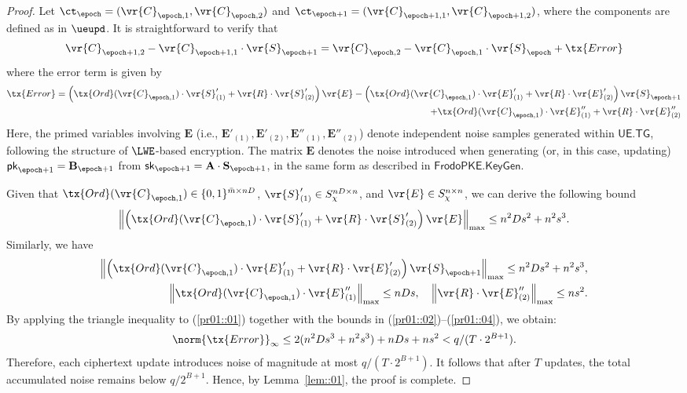 \documentclass{fundam}
\begin{document}
\begin{proof}
Let $\ct_{\epoch} =  (\vr{C}_{\epoch,1}, \vr{C}_{\epoch, 2})$ and $\ct_{\epoch+1} =  (\vr{C}_{\epoch+1,1}, \vr{C}_{\epoch+1, 2})$, where the components are defined as in $\ueupd$. It is straightforward to verify that 
 \begin{align*}
	\vr{C}_{\epoch+1,2} - \vr{C}_{\epoch +1, 1}\cdot \vr{S}_{\epoch +1} = \vr{C}_{\epoch,2} - \vr{C}_{\epoch , 1}\cdot \vr{S}_{\epoch } + \tx{Error}
\end{align*}
where the error term is given by
\begin{align}\label{pr01::01}
	\tx{Error}= \left(\tx{Ord}(\vr{C}_{\epoch , 1})\cdot\vr{S}_{(1)}' + \vr{R}\cdot \vr{S}_{(2)}'\right)\vr{E}- \left(\tx{Ord}(\vr{C}_{\epoch , 1})\cdot\vr{E}_{(1)}' + \vr{R}\cdot \vr{E}_{(2)}'\right)\vr{S}_{\epoch+1} \\
	+ \tx{Ord}(\vr{C}_{\epoch , 1})\cdot\vr{E}_{(1)}'' + \vr{R}\cdot \vr{E}_{(2)}'' \nonumber
\end{align}
Here, the primed variables involving $\mathbf{E}$ (i.e., $\mathbf{E}'_{(1)}, \mathbf{E}'_{(2)}, \mathbf{E}''_{(1)}, \mathbf{E}''_{(2)}$) denote independent noise samples generated within $\mathsf{UE.TG}$, following the structure of $\LWE$-based encryption. The matrix $\mathbf{E}$ denotes the noise introduced when generating (or, in this case, updating) $\mathsf{pk}_{\epoch+1} = \mathbf{B}_{\epoch+1}$ from $\mathsf{sk}_{\epoch+1} = \mathbf{A} \cdot \mathbf{S}_{\epoch+1}$, in the same form as described in $\mathsf{FrodoPKE.KeyGen}$.
%

\noindent Given that $\tx{Ord}(\vr{C}_{\epoch , 1})\in\{0,1\}^{\bar{m}\times nD}$, $\vr{S}_{(1)}' \in S_{\chi}^{nD\times n}$, and $\vr{E} \in S_{\chi}^{n\times n}$, we can derive the following bound
\begin{align}\label{pr01::02}
	\left\|  \left(\tx{Ord}(\vr{C}_{\epoch , 1})\cdot\vr{S}_{(1)}' + \vr{R}\cdot \vr{S}_{(2)}'\right)\vr{E} \right\|_{\max}\leq n^{2}Ds^{2}+n^{2}s^{3}.
\end{align}
Similarly, we have
\begin{align}
	\left\|  \left(\tx{Ord}(\vr{C}_{\epoch , 1})\cdot\vr{E}_{(1)}' + \vr{R}\cdot \vr{E}_{(2)}'\right)\vr{S}_{\epoch+1}    \right\|_{\max}\leq n^{2}Ds^{2}+n^{2}s^{3}, \label{pr01::03}\\
		\left\|  \tx{Ord}(\vr{C}_{\epoch , 1})\cdot\vr{E}_{(1)}'' \right\|_{\max}\leq nDs, ~~~ \left\|  \vr{R}\cdot \vr{E}_{(2)}'' \right\|_{\max}\leq ns^{2}. \label{pr01::04}
\end{align}
By applying the triangle inequality to (\ref{pr01::01}) together with the bounds in (\ref{pr01::02})–(\ref{pr01::04}), we obtain:
\begin{align*}
	\norm{\tx{Error}}_{\infty}\leq 2(n^{2}Ds^{3}+n^{2}s^{3})+nDs + ns^{2}<q/(T\cdot 2^{B+1}).
\end{align*}
Therefore, each ciphertext update introduces noise of magnitude at most $q / (T \cdot 2^{B+1})$. It follows that after $T$ updates, the total accumulated noise remains below $q / 2^{B+1}$. Hence, by Lemma~\ref{lem::01}, the proof is complete.
\end{proof}	
\end{document}
